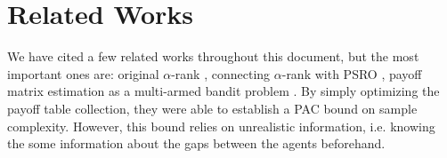 \documentclass{article}
\begin{document}
\section{Related Works}
We have cited a few related works throughout this document, but the most
important ones are: original $\alpha$-rank \cite{alpha}, connecting $\alpha$-rank with PSRO \cite{alphaPSRO}, 
payoff matrix estimation as a multi-armed bandit problem
\cite{goodone}. By simply optimizing the payoff table collection, they were
able to establish a PAC bound on sample complexity. However, this bound relies
on unrealistic information, i.e. knowing the some information about the gaps
between the agents beforehand.




\end{document}
